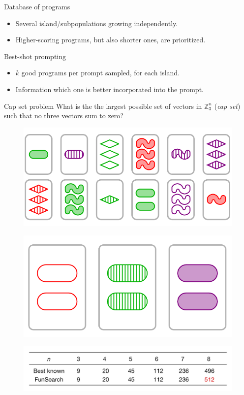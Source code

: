 \documentclass{beamer}
\begin{document}
\begin{frame}{Database of programs}
\begin{itemize}
\item Several island/subpopulations growing independently.
\item Higher-scoring programs, but also shorter ones, are prioritized.
\end{itemize}
\end{frame}

\begin{frame}{Best-shot prompting}
\begin{itemize}
\item $k$ good programs per prompt sampled, for each island.
\item Information which one is better incorporated into the prompt.
\end{itemize}
\end{frame}


\begin{frame}{Cap set problem}
What is the the largest possible set of vectors in $\mathbb{Z}^n_3$
 (\textit{cap set}) such that no three vectors sum to zero?
\pause
\begin{figure}
    \includegraphics[width=0.6\linewidth]{figures/no-set.png}
\end{figure}
    \pause
\begin{figure}
    \includegraphics[width=0.4\linewidth]{figures/set.png}
\end{figure}
\pause
\begin{figure}
\centering
\includegraphics[width=0.7\linewidth]{figures/cup-set-table.png}
\end{figure}
\end{frame}
\end{document}
